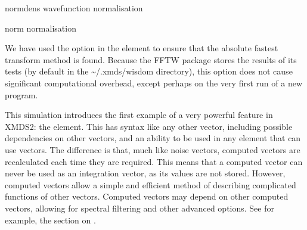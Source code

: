 \documentclass[letterpaper,10pt,english]{sphinxmanual}
\begin{document}
\begin{sphinxVerbatim}[commandchars=\\\{\}]

      
      norm\PYGZus{}dens
      wavefunction normalisation
      \PYG{c+cp}{\PYGZlt{}![CDATA[}
          
      \PYG{c+cp}{]]\PYGZgt{}}

     
      norm
      normalisation
      \PYG{c+cp}{\PYGZlt{}![CDATA[}
          
      \PYG{c+cp}{]]\PYGZgt{}}
\end{sphinxVerbatim}

\sphinxAtStartPar
We have used the  option in the  element to ensure that the absolute fastest transform method is found.  Because the FFTW package stores the results of its tests (by default in the \textasciitilde{}/.xmds/wisdom directory), this option does not cause significant computational overhead, except perhaps on the very first run of a new program.

\ignorespaces 
\sphinxAtStartPar
This simulation introduces the first example of a very powerful feature in XMDS2: the  element.  This has syntax like any other vector, including possible dependencies on other vectors, and an ability to be used in any element that can use vectors.  The difference is that, much like noise vectors, computed vectors are recalculated each time they are required.  This means that a computed vector can never be used as an integration vector, as its values are not stored.  However, computed vectors allow a simple and efficient method of describing complicated functions of other vectors.  Computed vectors may depend on other computed vectors, allowing for spectral filtering and other advanced options.  See for example, the {\hyperref[\detokenize{advanced_topics:advancedtopics}]{}} section on {\hyperref[\detokenize{advanced_topics:convolutions}]{}}.
\end{document}
